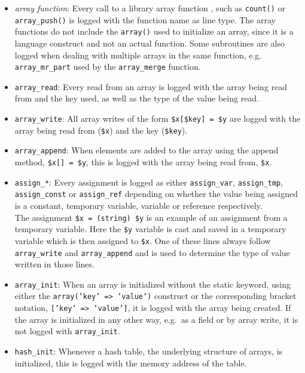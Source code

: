 \begin{itemize}
\item \emph{array function}: Every call to a library array function , such as \texttt{count()} or \texttt{array\_push()} is logged with the function name as line type. The array functions do not include the \texttt{array()} used to initialize an array, since it is a language construct and not an actual function. Some subroutines are also logged when dealing with multiple arrays in the same function, e.g. \texttt{array\_mr\_part} used by the \texttt{array\_merge} function.
\item \texttt{array\_read}: Every read from an array is logged with the array being read from and the key used, as well as the type of the value being read.
\item \texttt{array\_write}: All array writes of the form \texttt{\$x[\$key] = \$y} are logged with the array being read from (\texttt{\$x}) and the key (\texttt{\$key}). 
\item \texttt{array\_append}: When elements are added to the array using the append method, \texttt{\$x[] = \$y}, this is logged with the array being read from, \texttt{\$x}.
\item \texttt{assign\_*}: Every assignment is logged as either \texttt{assign\_var}, \texttt{assign\_tmp}, \texttt{assign\_const} or \texttt{assign\_ref} depending on whether the value being assigned is a constant, temporary variable, variable or reference respectively.\\
The assignment \texttt{\$x = (string) \$y} is an example of an assignment from a temporary variable. Here the \texttt{\$y} variable is cast and saved in a temporary variable which is then assigned to \texttt{\$x}. One of these lines always follow \texttt{array\_write} and \texttt{array\_append} and is used to determine the type of value written in those lines.
\item \texttt{array\_init}: When an array is initialized without the static keyword, using either the \texttt{array('key' => 'value')} construct or the corresponding bracket notation, \texttt{['key' => 'value']}, it is logged with the array being created. If the array is initialized in any other way, e.g.\ as a field or by array write, it is not logged with \texttt{array\_init}.
\item \texttt{hash\_init}: Whenever a hash table, the underlying structure of arrays, is initialized, this is logged with the memory address of the table.
\end{itemize}

